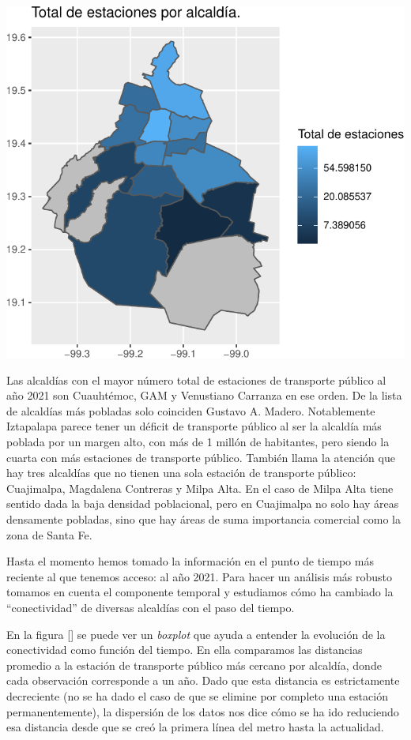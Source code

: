 \documentclass[
  spanish,
]{article}
\begin{document}
\begin{center}\includegraphics{proyecto_files/figure-latex/unnamed-chunk-7-1} \end{center}

Las alcaldías con el mayor número total de estaciones de transporte
público al año 2021 son Cuauhtémoc, GAM y Venustiano Carranza en ese
orden. De la lista de alcaldías más pobladas solo coinciden Gustavo A.
Madero. Notablemente Iztapalapa parece tener un déficit de transporte
público al ser la alcaldía más poblada por un margen alto, con más de 1
millón de habitantes, pero siendo la cuarta con más estaciones de
transporte público. También llama la atención que hay tres alcaldías que
no tienen una sola estación de transporte público: Cuajimalpa, Magdalena
Contreras y Milpa Alta. En el caso de Milpa Alta tiene sentido dada la
baja densidad poblacional, pero en Cuajimalpa no solo hay áreas
densamente pobladas, sino que hay áreas de suma importancia comercial
como la zona de Santa Fe.

Hasta el momento hemos tomado la información en el punto de tiempo más
reciente al que tenemos acceso: al año 2021. Para hacer un análisis más
robusto tomamos en cuenta el componente temporal y estudiamos cómo ha
cambiado la ``conectividad'' de diversas alcaldías con el paso del
tiempo.

En la figura {[}{]} se puede ver un \emph{boxplot} que ayuda a entender
la evolución de la conectividad como función del tiempo. En ella
comparamos las distancias promedio a la estación de transporte público
más cercano por alcaldía, donde cada observación corresponde a un año.
Dado que esta distancia es estrictamente decreciente (no se ha dado el
caso de que se elimine por completo una estación permanentemente), la
dispersión de los datos nos dice cómo se ha ido reduciendo esa distancia
desde que se creó la primera línea del metro hasta la actualidad.
\end{document}
